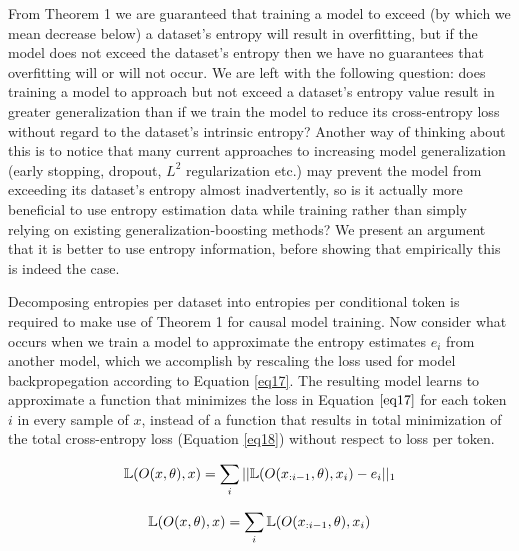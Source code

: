 \documentclass{article}
\begin{document}
    From Theorem 1 we are guaranteed that training a model to exceed (by which we mean decrease below) a dataset's entropy will result in overfitting, but if the model does not exceed the dataset's entropy then we have no guarantees that overfitting will or will not occur. We are left with the following question: does training a model to approach but not exceed a dataset's entropy value result in greater generalization than if we train the model to reduce its cross-entropy loss without regard to the dataset's intrinsic entropy? Another way of thinking about this is to notice that many current approaches to increasing model generalization (early stopping, dropout, $L^2$ regularization etc.) may prevent the model from exceeding its dataset's entropy almost inadvertently, so is it actually more beneficial to use entropy estimation data while training rather than simply relying on existing generalization-boosting methods? We present an argument that it is better to use entropy information, before showing that empirically this is indeed the case. 
    
    Decomposing entropies per dataset into entropies per conditional token is required to make use of Theorem 1 for causal model training. Now consider what occurs when we train a model to approximate the entropy estimates $e_i$ from another model, which we accomplish by rescaling the loss used for model backpropegation according to Equation \ref{eq17}. The resulting model learns to approximate a function that minimizes the loss in Equation $\ref{eq17}$ for each token $i$ in every sample of $x$, instead of a function that results in total minimization of the total cross-entropy loss (Equation \ref{eq18}) without respect to loss per token. 

    \begin{equation}
        \Bbb L(O(x, \theta), x) = \sum_i || \Bbb L(O(x_{:i-1}, \theta), x_i) - e_i ||_1
        \label{eq17}
    \end{equation}

    
    \begin{equation}
        \Bbb L(O(x, \theta), x) = \sum_i \Bbb L(O(x_{:i-1}, \theta), x_i)
        \label{eq18}
    \end{equation}
\end{document}
